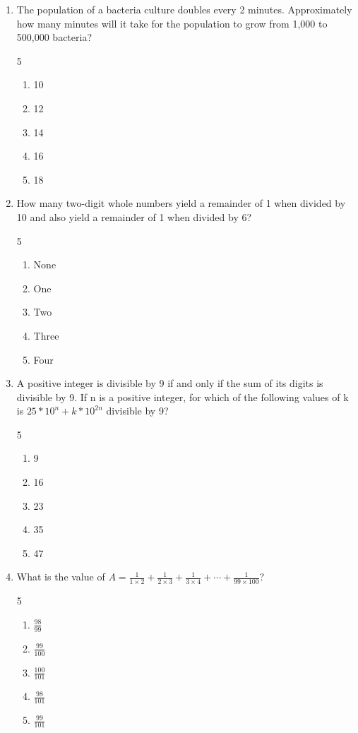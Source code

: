 \documentclass[12pt]{article}
\begin{document}
\begin{enumerate}
\item The population of a bacteria culture doubles every 2 minutes. Approximately how many minutes will it take for the population to grow from 1,000 to 500,000 bacteria?
\begin{multicols}{5}
\begin{enumerate}[label=(\Alph*)]
\item 10
\item 12
\item 14
\item 16
\item 18
\end{enumerate}
\end{multicols}

\item How many two-digit whole numbers yield a remainder of 1 when divided by 10 and also yield a remainder of 1 when divided by 6?
\begin{multicols}{5}
\begin{enumerate}[label=(\Alph*)]
\item None
\item One
\item Two
\item Three
\item Four
\end{enumerate}
\end{multicols}

\item A positive integer is divisible by 9 if and only if the sum of its digits is divisible by 9. If n is a positive integer, for which of the following values of k is $25 * 10^n + k * 10^{2n}$ divisible by 9?
\begin{multicols}{5}
\begin{enumerate}[label=(\Alph*)]
\item 9
\item 16
\item 23
\item 35
\item 47
\end{enumerate}
\end{multicols}

\item What is the value of $A = \frac{1}{1\times2} + \frac{1}{2\times3} + \frac{1}{3\times4} + \cdots + \frac{1}{99\times100}$?
\begin{multicols}{5}
\begin{enumerate}[label=(\Alph*)]
\item $\frac{98}{99}$
\item $\frac{99}{100}$
\item $\frac{100}{101}$
\item $\frac{98}{101}$
\item $\frac{99}{101}$
\end{enumerate}
\end{multicols}


\end{enumerate}
\end{document}
